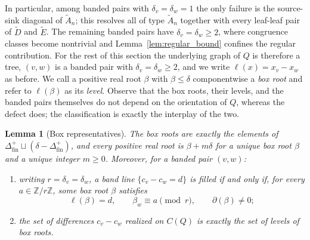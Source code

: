 \documentclass[11pt, a4paper]{amsart}
\newtheorem{lemma}[theorem]{Lemma}
\theoremstyle{definition}
\newcommand{\ZZ}{\mathbb{Z}}
\begin{document}
In particular, among banded pairs with $\delta_v = \delta_w = 1$ the only
failure is the source-sink diagonal of $\widetilde{A}_n$; this resolves all
of type $\widetilde{A}_n$ together with every leaf-leaf pair of
$\widetilde{D}$ and $\widetilde{E}$. The remaining banded pairs have
$\delta_v = \delta_w \geq 2$, where congruence classes become nontrivial
and Lemma~\ref{lem:regular_bound} confines the regular contribution. For the
rest of this section the underlying graph of $Q$ is therefore a tree, $(v,
w)$ is a banded pair with $\delta_v = \delta_w \geq 2$, and we write
$\ell(x) = x_v - x_w$ as before. We call a positive real root $\beta$ with
$\beta \leq \delta$ componentwise a \emph{box root} and refer to
$\ell(\beta)$ as its \emph{level}. Observe that the box roots, their levels,
and the banded pairs themselves do not depend on the orientation of $Q$,
whereas the defect does; the classification is exactly the interplay of the
two.

\begin{lemma}[Box representatives]
\label{lem:box}
The box roots are exactly the elements of
$\Delta_{\mathrm{fin}}^{+} \sqcup (\delta - \Delta_{\mathrm{fin}}^{+})$,
and every positive real root is $\beta + m\delta$ for a unique box root
$\beta$ and a unique integer $m \geq 0$. Moreover, for a banded pair
$(v, w)$:
\begin{enumerate}[label=\textup{(\arabic*)}]
\item writing $r=\delta_v=\delta_w$, a band line
  $\{c_v-c_w=d\}$ is filled if and only if, for every
  $a\in\ZZ/r\ZZ$, some box root $\beta$ satisfies
  \[
    \ell(\beta)=d,\qquad \beta_w\equiv a\pmod r,
    \qquad \partial(\beta)\neq0;
  \]
\item the set of differences $c_v - c_w$ realized on $C(Q)$ is exactly
  the set of levels of box roots.
\end{enumerate}
\end{lemma}
\end{document}
